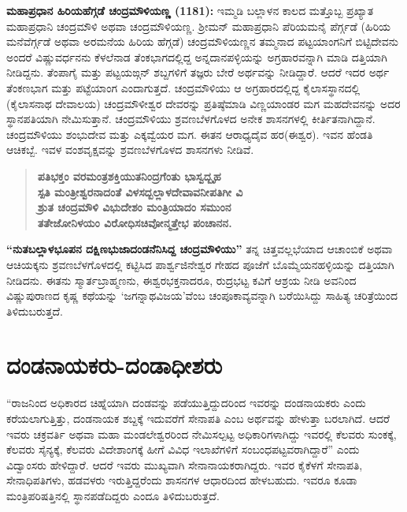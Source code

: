 \textbf{ಮಹಾಪ್ರಧಾನ ಹಿರಿಯಹೆಗ್ಗಡೆ ಚಂದ್ರಮೌಳಿಯಣ್ಣ (1181):} ಇಮ್ಮಡಿ ಬಲ್ಲಾಳನ ಕಾಲದ ಮತ್ತೊಬ್ಬ ಪ್ರಖ್ಯಾತ ಮಹಾಪ್ರಧಾನಿ ಚಂದ್ರಮೌಳಿ ಅಥವಾ ಚಂದ್ರಮೌಳಿಯಣ್ಣ. ಶ‍್ರೀಮನ್​ ಮಹಾಪ್ರಧಾನಿ ಪೆರಿಯಮನೈ ಪೆರ್ಗ್ಗಡೆ (ಹಿರಿಯ ಮನೆವೆರ್ಗ್ಗಡೆ ಅಥವಾ ಅರಮನೆಯ ಹಿರಿಯ ಹೆಗ್ಗಡೆ) ಚಂದ್ರಮೌಳಿಯಣ್ಣನ ತಮ್ಮನಾದ ಪಟ್ಟಯಾಂಗನಿಗೆ ಬಿಟ್ಟಿದೇವನು ಅಂದರೆ ವಿಷ್ಣುವರ್ಧನನು ಕೆಳಲೆನಾಡ ತೆಂಕಭಾಗದಲ್ಲಿದ್ದ ಅನ್ನದಾನಪಳ್ಳಿಯನ್ನು ಅಗ್ರಹಾರವನ್ನಾಗಿ ಮಾಡಿ ದತ್ತಿಯಾಗಿ ನೀಡಿದ್ದನು. ತೆಂಪಾಗೈ ಮತ್ತು ಪಟ್ಟಯಙ್ಗನ್​ ಶಬ್ದಗಳಿಗೆ ತಜ್ಞರು ಬೇರೆ ಅರ್ಥವನ್ನು ನೀಡಿದ್ದಾರೆ. ಆದರೆ ಇದರ ಅರ್ಥ ತೆಂಕಣಭಾಗ ಮತ್ತು ಪಟ್ಟೆಯಾಂಗ ಎಂದಾಗುತ್ತದೆ. ಚಂದ್ರಮೌಳಿಯು ಆ ಅಗ್ರಹಾರದಲ್ಲಿದ್ದ ಕೈಲಾಸಸ್ಥಾನದಲ್ಲಿ (ಕೈಲಾಸನಾಥ ದೇವಾಲಯ) ಚಂದ್ರಮೌಳೀಶ್ವರ ದೇವರನ್ನು ಪ್ರತಿಷ್ಠೆಮಾಡಿ ವಿಣ್ಣಯಾಂಡರ ಮಗ ಮಹದೇವನನ್ನು ಅದರ ಸ್ಥಾನಪತಿಯಾಗಿ ನೇಮಿಸುತ್ತಾನೆ. ಚಂದ್ರಮೌಳಿಯು ಶ್ರವಣಬೆಳಗೊಳದ ಅನೇಕ ಶಾಸನಗಳಲ್ಲಿ ಕೀರ್ತಿತನಾಗಿದ್ದಾನೆ. ಚಂದ್ರಮೌಳಿಯು ಶಂಭುದೇವ ಮತ್ತು ಎಕ್ಕವ್ವೆಯರ ಮಗ. ಈತನ ಆರಾಧ್ಯದೈವ ಹರ(ಈಶ್ವರ). ಇವನ ಹೆಂಡತಿ ಆಚಿಕಬ್ಬೆ. ಇವಳ ವಂಶವೃಕ್ಷವನ್ನು ಶ್ರವಣಬೆಳಗೊಳದ ಶಾಸನಗಳು ನೀಡಿವೆ.

\begin{verse}
\textbf{ಪತಿಭಕ್ತಂ ವರಮಂತ್ರಶಕ್ತಿಯುತನಿಂದ್ರಗೆಂತು ಭಾಸ್ವದ್ಬೃಹ} \\\textbf{ಸ್ಪತಿ ಮಂತ್ರೀಶ್ವರನಾದಂತೆ ವಿಳಸದ್ಬಲ್ಲಾಳದೇವಾವನೀಪತಿಗೀ ವಿ} \\\textbf{ಶ್ರುತ ಚಂದ್ರಮೌಳಿ ವಿಭುದೇಶಂ ಮಂತ್ರಿಯಾದಂ ಸಮುಂನ} \\\textbf{ತತೇಜೋನಿಳಯಂ ವಿರೋಧಿಸಚಿವೋನ್ಮತ್ತೇಭ ಪಂಚಾನನ.}
\end{verse}

\textbf{“ನುತಬಲ್ಲಾಳಭೂಪನ ದಕ್ಷಿಣಭುಜಾದಂಡನೆನಿಸಿದ್ದ ಚಂದ್ರಮೌಳಿಯು”} ತನ್ನ ಚಿತ್ತವಲ್ಲಭೆಯಾದ ಆಚಾಂಬಿಕೆ ಅಥವಾ ಆಚಿಯಕ್ಕನು ಶ್ರವಣಬೆಳಗೊಳದಲ್ಲಿ ಕಟ್ಟಿಸಿದ ಪಾರ್ಶ್ವಜಿನೇಶ್ವರ ಗೇಹದ ಪೂಜೆಗೆ ಬೊಮ್ಮೆಯನಹಳ್ಳಿಯನ್ನು ದತ್ತಿಯಾಗಿ ನೀಡಿದನು. ಈತನು ಸ್ಮಾರ್ತಬ್ರಾಹ್ಮಣನು, ಈಶ್ವರಭಕ್ತನಾದರೂ, ರುದ್ರಭಟ್ಟ ಕವಿಗೆ ಆಶ್ರಯ ನೀಡಿ ಅವನಿಂದ ವಿಷ್ಣುಪುರಾಣದ ಕೃಷ್ಣ ಕಥೆಯನ್ನು ‘ಜಗನ್ನಾಥವಿಜಯ’ವೆಂಬ ಚಂಪೂಕಾವ್ಯವನ್ನಾಗಿ ಬರೆಯಿಸಿದ್ದು ಸಾಹಿತ್ಯ ಚರಿತ್ರೆಯಿಂದ ತಿಳಿದುಬರುತ್ತದೆ.


\section{ದಂಡನಾಯಕರು-ದಂಡಾಧೀಶರು}

“ರಾಜನಿಂದ ಅಧಿಕಾರದ ಚಿಹ್ನೆಯಾಗಿ ದಂಡವನ್ನು ಪಡೆಯುತ್ತಿದ್ದುದರಿಂದ ಇವರನ್ನು ದಂಡನಾಯಕರು ಎಂದು ಕರೆಯಲಾಗು\-ತ್ತಿತ್ತು, ದಂಡನಾಯಕ ಶಬ್ದಕ್ಕೆ ಇದುವರೆಗೆ ಸೇನಾಪತಿ ಎಂಬ ಅರ್ಥವನ್ನು ಹೇಳುತ್ತಾ ಬರಲಾಗಿದೆ. ಆದರೆ ಇವರು ಚಕ್ರವರ್ತಿ ಅಥವಾ ಮಹಾ ಮಂಡಲೇಶ್ವರರಿಂದ ನೇಮಿಸಲ್ಪಟ್ಟ ಅಧಿಕಾರಿಗಳಾಗಿದ್ದು ಇವರಲ್ಲಿ ಕೆಲವರು ಸುಂಕಕ್ಕೆ, ಕೆಲವರು ಸೈನ್ಯಕ್ಕೆ, ಕೆಲವರು ವಿದೇಶಾಂಗಕ್ಕೆ ಹೀಗೆ ವಿವಿಧ ಇಲಾಖೆಗಳಿಗೆ ಸಂಬಂಧಪಟ್ಟವರಾಗಿದ್ದಾರೆ” ಎಂದು ವಿದ್ವಾಂಸರು ಹೇಳಿದ್ದಾರೆ. ಆದರೆ ಇವರು ಮುಖ್ಯವಾಗಿ ಸೇನಾನಾಯಕರಾಗಿದ್ದರು. ಇವರ ಕೈಕೆಳಗೆ ಸೇನಾಪತಿ, ಸೇನಾಧಿಪತಿಗಳು, ಹಡವಳರು ಇರುತ್ತಿದ್ದರೆಂದು ಶಾಸನಗಳ ಆಧಾರದಿಂದ ಹೇಳಬಹುದು. ಇವರೂ ಕೂಡಾ ಮಂತ್ರಿಪರಿಷತ್ತಿನಲ್ಲಿ ಸ್ಥಾನಪಡೆದಿದ್ದರು ಎಂದೂ ತಿಳಿದುಬರುತ್ತದೆ.

